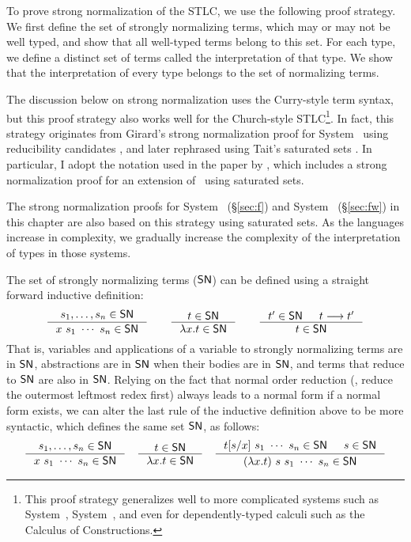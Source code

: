To prove strong normalization of the STLC, we use the following proof strategy.
We first define the set of strongly normalizing terms, which may or may not be
well typed, and show that all well-typed terms belong to this set.
For each type, we define a distinct set of terms called the interpretation
of that type. We show that the interpretation of every type
belongs to the set of normalizing terms.

The discussion below on strong normalization uses the
Curry-style term syntax, but this proof strategy also works well
for the Church-style STLC\footnote{This proof strategy generalizes well
        to more complicated systems such as System~\F, System~\Fw, and
        even for dependently-typed calculi such as
        the Calculus of Constructions\cite{Geuvers94}.}.
In fact, this strategy originates from Girard's strong normalization proof
for System \F\ using reducibility candidates \cite{Gir71}, and later rephrased
using Tait's saturated sets \cite{Tait75}. In particular, I adopt
the notation used in the paper by \citet{AbeMat04}, which includes
a strong normalization proof for an extension of \Fw\ using saturated sets.

The strong normalization proofs for System \F\ (\S\ref{sec:f}) and
System \Fw\ (\S\ref{sec:fw}) in this chapter 
are also based on this strategy using saturated sets. As the languages
increase in complexity, we gradually
increase the complexity of the interpretation of types in those systems.

The set of strongly normalizing terms ($\mathsf{SN}$) can be defined
using a straight forward inductive definition:
\[
\inference{s_1,\ldots,s_n\in\SN}{x~s_1~\cdots~s_n \in \SN}
\qquad
\inference{t \in \SN}{\l x.t \in \SN}
\qquad
\inference{t' \in \SN & t --> t'}{t \in \SN}
\]
That is, variables and applications of a variable to strongly normalizing terms
are in $\mathsf{SN}$, abstractions are in $\mathsf{SN}$ when their bodies are in $\mathsf{SN}$,
and terms that reduce to $\mathsf{SN}$ are also in $\mathsf{SN}$. Relying on the fact that
normal order reduction (\ie, reduce the outermost leftmost redex first) always
leads to a normal form if a normal form exists, we can alter the last rule of
the inductive definition above to be more syntactic, which defines the same set
$\mathsf{SN}$, as follows:
\[
\inference{s_1,\ldots,s_n\in\SN}{x~s_1~\cdots~s_n \in \SN}
\quad
\inference{t \in \SN}{\l x.t \in \SN}
\quad
\inference{t[s/x]~s_1~\cdots~s_n\in \SN & s\in\SN}
        {(\lambda x.t)~s~s_1~\cdots~s_n \in \SN}
\]

